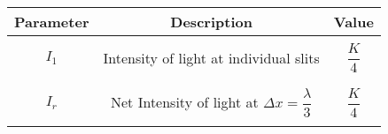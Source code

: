 \begin{tabular}{|c|c|c|}
\hline 
   \textbf{Parameter}  &\textbf{Description} &\textbf{Value} \\
\hline
&&\\
$I_1$&Intensity of light at individual slits&$\dfrac{K}{4}$ \\ &&\\ 
\hline
&&\\
$I_r$&Net Intensity of light at $\Delta x =\dfrac{\lambda}{3}$ &$\dfrac{K}{4}$ \\&&\\
\hline
\end{tabular}
